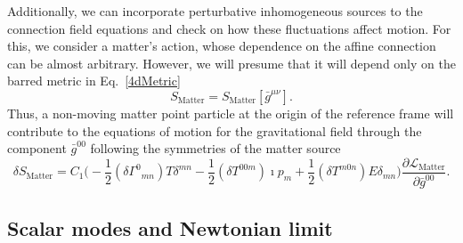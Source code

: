\documentclass[twocolumn,aps,
  showpacs,showkeys,prd,superscriptaddress]{revtex4-1}
\renewcommand{\(}{\left(}
\renewcommand{\)}{\right)}
\renewcommand{\[}{\left[}
\renewcommand{\]}{\right]}
\begin{document}
Additionally, we can incorporate perturbative inhomogeneous sources to the connection field equations and check on how these fluctuations affect motion. For this, we consider a matter's action, whose dependence on the affine connection can be almost arbitrary. However, we will presume that it will depend only on the barred metric in Eq.~\eqref{4dMetric}
$$ S_{\text{Matter}} = {S}_{\text{Matter}}[\bar{g}^{\mu\nu}].$$
Thus, a non-moving matter point particle at the origin of the reference frame will contribute to the equations of motion for the gravitational field through the component $\bar{g}^{00}$ following the symmetries of the matter source 
\begin{dmath}
  \label{mattervariation}
  \delta {S}_{\text{Matter}} =  C_1 \Big(- \frac{1}{2} ({\delta\Gamma}^{0}{}_{m n})  T {\delta}^{m n} - \frac{1}{2}  ({\delta T}^{0 0 m})  \imath {p}_{m} + \frac{1}{2}  ({\delta T}^{m 0 n})  E {\delta}_{m n} \Big)\frac{\partial\mathcal{L}_{\text{Matter}}}{\partial \bar{g}^{00}}.
\end{dmath}


\subsection*{Scalar modes  and Newtonian limit}
\end{document}
